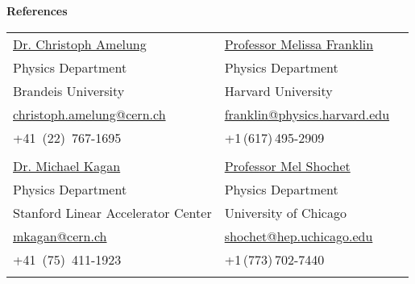 \documentclass[letterpaper,11pt,oneside]{article}
\begin{document}
\newpage
 \raggedright
 \textbf{\Large{References}} \\
 \normalsize
 \begin{flushleft}
\noindent \begin{tabular}{@{} l l l}
  \href{http://amelung.web.cern.ch/amelung/}{Dr. Christoph Amelung} 
  &\href{https://www.physics.harvard.edu/people/facpages/franklin}{Professor Melissa Franklin} \\
  Physics Department &  Physics Department  \\
  Brandeis University & Harvard University \\
  \small{\href{mailto:christoph.amelung@cern.ch}{christoph.amelung@cern.ch}}
  &\small{\href{mailto:franklin@physics.harvard.edu}{franklin@physics.harvard.edu}} \\ 
  +41\, (22)\, 767-1695 & +1\,(617)\,495-2909 \\ 
 & \\
  \href{http://www.slac.stanford.edu/exp/atlas/general/slac-personnel.html}{Dr. Michael Kagan}
  &\href{http://hep.uchicago.edu/cdf/shochet/mel_shochet.html}{Professor Mel Shochet}  \\
  Physics Department &  Physics Department  \\
  Stanford Linear Accelerator Center & University of Chicago \\
  \small{\href{mailto:mkagan@cern.ch }{mkagan@cern.ch}}
  &\small{\href{mailto:shochet@hep.uchicago.edu}{shochet@hep.uchicago.edu}} \\ 
  +41\, (75)\, 411-1923 & +1\,(773)\,702-7440 \\ 
 \hspace{0.5\linewidth} & \hspace{0.5\linewidth} \\
\end{tabular}
\end{flushleft}


\clearpage
\end{document}
